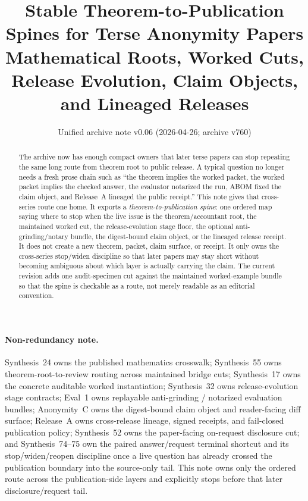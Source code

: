 \documentclass[11pt]{article}
\title{Stable Theorem-to-Publication Spines for Terse Anonymity Papers\\
\large Mathematical Roots, Worked Cuts, Release Evolution, Claim Objects, and Lineaged Releases}
\author{}
\date{Unified archive note v0.06 (2026-04-26; archive v760)}
\begin{document}
\maketitle

\begin{abstract}
The archive now has enough compact owners that later terse papers can stop repeating the same long route from theorem root to public release.
A typical question no longer needs a fresh prose chain such as ``the theorem implies the worked packet, the worked packet implies the checked answer, the evaluator notarized the run, ABOM fixed the claim object, and Release~A lineaged the public receipt.''
This note gives that cross-series route one home.
It exports a \emph{theorem-to-publication spine}: one ordered map saying where to stop when the live issue is the theorem/accountant root, the maintained worked cut, the release-evolution stage floor, the optional anti-grinding/notary bundle, the digest-bound claim object, or the lineaged release receipt.
It does not create a new theorem, packet, claim surface, or receipt.
It only owns the cross-series stop/widen discipline so that later papers may stay short without becoming ambiguous about which layer is actually carrying the claim.
The current revision adds one audit-specimen cut against the maintained worked-example bundle so that the spine is checkable as a route, not merely readable as an editorial convention.
\end{abstract}

\paragraph{Non-redundancy note.}
Synthesis~24 owns the published mathematics crosswalk; Synthesis~55 owns theorem-root-to-review routing across maintained bridge cuts; Synthesis~17 owns the concrete auditable worked instantiation; Synthesis~32 owns release-evolution stage contracts; Eval~1 owns replayable anti-grinding / notarized evaluation bundles; Anonymity~C owns the digest-bound claim object and reader-facing diff surface; Release~A owns cross-release lineage, signed receipts, and fail-closed publication policy; Synthesis~52 owns the paper-facing on-request disclosure cut; and Synthesis~74--75 own the paired answer/request terminal shortcut and its stop/widen/reopen discipline once a live question has already crossed the publication boundary into the source-only tail.\cite{series:mathcrosswalk,series:seriesspines,series:workedexample,series:releasespine,series:evalnotary,series:abomoinl,series:releaseproperty,series:challengeanswerdisclosurepackets,series:pairedterminalcitationdiscipline,series:pairedterminalcutoverrule}
This note owns only the ordered route across the publication-side layers and explicitly stops before that later disclosure/request tail.
\end{document}
